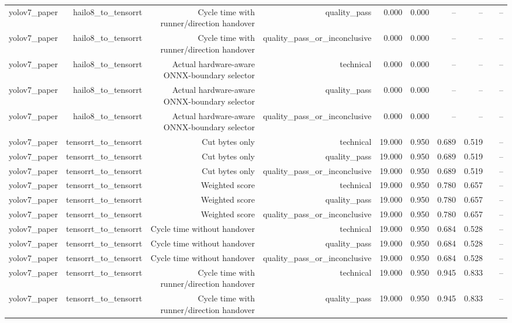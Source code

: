 \begin{table}[t]
\begin{tabular}{lrrrrrrrrr}
yolov7\_paper & hailo8\_to\_tensorrt & Cycle time with runner/direction handover & quality\_pass & 0.000 & 0.000 & -- & -- &  & -- \\
yolov7\_paper & hailo8\_to\_tensorrt & Cycle time with runner/direction handover & quality\_pass\_or\_inconclusive & 0.000 & 0.000 & -- & -- &  & -- \\
yolov7\_paper & hailo8\_to\_tensorrt & Actual hardware-aware ONNX-boundary selector & technical & 0.000 & 0.000 & -- & -- &  & -- \\
yolov7\_paper & hailo8\_to\_tensorrt & Actual hardware-aware ONNX-boundary selector & quality\_pass & 0.000 & 0.000 & -- & -- &  & -- \\
yolov7\_paper & hailo8\_to\_tensorrt & Actual hardware-aware ONNX-boundary selector & quality\_pass\_or\_inconclusive & 0.000 & 0.000 & -- & -- &  & -- \\
yolov7\_paper & tensorrt\_to\_tensorrt & Cut bytes only & technical & 19.000 & 0.950 & 0.689 & 0.519 &  & -- \\
yolov7\_paper & tensorrt\_to\_tensorrt & Cut bytes only & quality\_pass & 19.000 & 0.950 & 0.689 & 0.519 &  & -- \\
yolov7\_paper & tensorrt\_to\_tensorrt & Cut bytes only & quality\_pass\_or\_inconclusive & 19.000 & 0.950 & 0.689 & 0.519 &  & -- \\
yolov7\_paper & tensorrt\_to\_tensorrt & Weighted score & technical & 19.000 & 0.950 & 0.780 & 0.657 &  & -- \\
yolov7\_paper & tensorrt\_to\_tensorrt & Weighted score & quality\_pass & 19.000 & 0.950 & 0.780 & 0.657 &  & -- \\
yolov7\_paper & tensorrt\_to\_tensorrt & Weighted score & quality\_pass\_or\_inconclusive & 19.000 & 0.950 & 0.780 & 0.657 &  & -- \\
yolov7\_paper & tensorrt\_to\_tensorrt & Cycle time without handover & technical & 19.000 & 0.950 & 0.684 & 0.528 &  & -- \\
yolov7\_paper & tensorrt\_to\_tensorrt & Cycle time without handover & quality\_pass & 19.000 & 0.950 & 0.684 & 0.528 &  & -- \\
yolov7\_paper & tensorrt\_to\_tensorrt & Cycle time without handover & quality\_pass\_or\_inconclusive & 19.000 & 0.950 & 0.684 & 0.528 &  & -- \\
yolov7\_paper & tensorrt\_to\_tensorrt & Cycle time with runner/direction handover & technical & 19.000 & 0.950 & 0.945 & 0.833 &  & -- \\
yolov7\_paper & tensorrt\_to\_tensorrt & Cycle time with runner/direction handover & quality\_pass & 19.000 & 0.950 & 0.945 & 0.833 &  & -- \\

\end{tabular}
\end{table}
